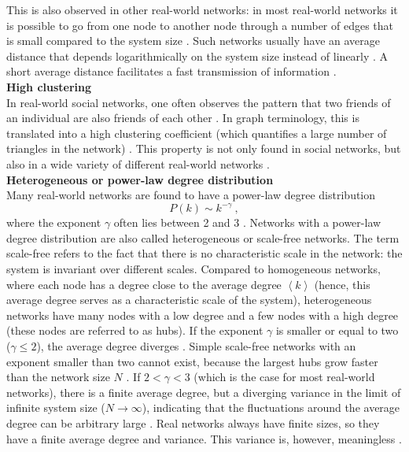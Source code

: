 \documentclass[11 pt , letterpaper , twoside , openright]{book}
\begin{document}
\newline
This is also observed in other real-world networks: in most real-world networks it is possible to go from one node to another node through a number of edges that is small compared to the system size \cite{RealWorld}. Such networks usually have an average distance that depends logarithmically on the system size instead of linearly \cite{Newman2003}. A short average distance facilitates a fast transmission of information \cite{Newman2003}\cite{Zhang2014}.\\
\newline
\textbf{High clustering}\\
\newline
In real-world social networks, one often observes the pattern that two friends of an individual are also friends of each other \cite{RealWorld}. In graph terminology, this is translated into a high clustering coefficient (which quantifies a large number of triangles in the network) \cite{RealWorld}. This property is not only found in social networks, but also in a wide variety of different real-world networks \cite{RealWorld}.\\
\newline
\textbf{Heterogeneous or power-law degree distribution}\\
\newline
Many real-world networks are found to have a power-law degree distribution
\begin{equation}
	P(k) \sim k^{-\gamma} \ ,
\end{equation}
where the exponent $\gamma$ often lies between 2 and 3 \cite{RealWorld}. Networks with a power-law degree distribution are also called heterogeneous or scale-free networks. The term scale-free refers to the fact that there is no characteristic scale in the network: the system is invariant over different scales. Compared to homogeneous networks, where each node has a degree close to the average degree $\left<k\right>$ (hence, this average degree serves as a characteristic scale of the system),  heterogeneous networks have many nodes with a low degree and a few nodes with a high degree (these nodes are referred to as hubs). If the exponent $\gamma$ is smaller or equal to two ($\gamma \leqslant 2$), the average degree diverges \cite{Newman2005}. Simple scale-free networks with an exponent smaller than two cannot exist, because the largest hubs grow faster than the network size $N$ \cite{Barabasi2016}. If $2 < \gamma < 3$ (which is the case for most real-world networks), there is a finite average degree, but a diverging variance in the limit of infinite system size ($N \rightarrow \infty$), indicating that the fluctuations around the average degree can be arbitrary large \cite{Newman2005}. Real networks always have finite sizes, so they have a finite average degree and variance. This variance is, however, meaningless \cite{Newman2005}.\\
\end{document}
